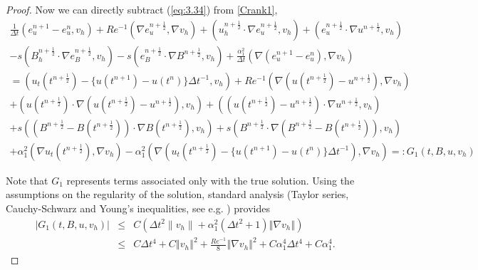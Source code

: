 \documentclass[11pt]{article}%
\numberwithin{equation}{section}
\newcommand{\norm}[1]{\left\Vert#1\right\Vert}
\def\grad{{\nabla}}
\def\nplushalf{{n+\frac12}}
\begin{document}
\begin{proof}
	Now we can directly subtract (\ref{eq:3.34}) from \eqref{Crank1},
	\begin{multline}
	\frac{1}{\Delta t}(e^{n+1}_{u} - e^{n}_{u},v_{h})  + Re^{-1}(\grad{e}^{\nplushalf}_{u},\grad{v_{h}})
	 + (u^{\nplushalf}_{h}\cdot\grad{e}^{\nplushalf}_{u},v_{h}) + (e^{\nplushalf}_{u}\cdot \grad{u}^{\nplushalf},v_{h}) \\
	  - s(B^{\nplushalf}_{h}\cdot \grad{e}^{\nplushalf}_{B},v_{h}) - s(e^{\nplushalf}_{B}\cdot\grad{B}^{\nplushalf},v_{h})+\frac{\alpha_1^2}{\Delta t}(\nabla (e_u^{n+1}-e_u^{n}),\nabla v_h) \\
	 = (u_{t}(t^{\nplushalf}) - \{u(t^{n+1}) - u(t^{n})\}\Delta t^{-1},v_{h}) + Re^{-1}(\grad{(u(t^{\nplushalf}) - u^{\nplushalf})},\grad{v_{h}}) \\
	 + (u(t^{\nplushalf})\cdot \grad{(u(t^{\nplushalf})-u^{\nplushalf})},v_{h}) + ((u(t^{\nplushalf}) - u^{\nplushalf})\cdot\grad{u}^{\nplushalf},v_{h})\\
	 	 + s((B^{\nplushalf}-B(t^{\nplushalf}))\cdot\grad{B}(t^{\nplushalf}),v_{h})
	 + s(B^{\nplushalf}\cdot \grad{(B^{\nplushalf} - B(t^{\nplushalf}))},v_{h})\\
          + \alpha_1^2(\nabla u_{t}(t^{\nplushalf}),\nabla v_{h}) 
          - \alpha_1^2(\nabla(u_{t}(t^{\nplushalf}) - \{u(t^{n+1}) - u(t^{n})\}\Delta t^{-1}),\nabla v_{h})
	=: G_{1}(t,B,u,v_{h})
	\label{eq:3.41}
	\end{multline}
	
	Note that $G_{1}$ represents terms associated only with the true solution.
	Using the assumptions on the regularity of the solution, standard analysis (Taylor series, Cauchy-Schwarz and Young's inequalities, see e.g. \cite{Laytonbook}) provides
	\begin{eqnarray}
	| G_1(t,B,u,v_h) | &\le& C(\Delta t^2 \| v_h \|+\alpha_1^2(\Delta t^2+1)\norm{\grad{v}_h})\nonumber \\
	& \le & C\Delta t^4+C\norm{v_h}^2+\frac{Re^{-1}}{8}\norm{\grad{v}_h}^2+C\alpha_1^4\Delta t^4 + C\alpha_1^4.
	\label{g1bound}
	\end{eqnarray}
	

\end{proof}
\end{document}
